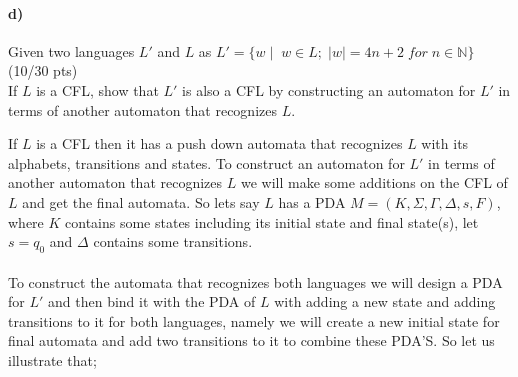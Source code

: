\documentclass[a4paper,12pt]{article}
\begin{document}
\paragraph{d)} Given two languages $L'$ and $L$ as $L'=\{w \mid \; w\in L; \; |w|=4n+2 \; for\; n\in \mathbb{N} \}$
\hfill \small{(10/30 pts)} \\
If $L$ is a CFL, show that $L'$ is also a CFL by constructing an automaton for $L'$ in terms of another automaton that recognizes $L$. \\
\newpage
\begin{tcolorbox}
If $L$ is a CFL then it has a push down automata that recognizes $L$ with its alphabets, transitions and states. To construct an automaton for $L'$ in terms of another automaton that recognizes $L$ we will make some additions on the CFL of $L$ and get the final automata. So lets say $L$ has a PDA $M = (K,\Sigma ,\Gamma ,\Delta ,s,F)$, where $K$ contains some states including its initial state and final state(s), let $s = q_0$ and $\Delta$ contains some transitions.\\\\
To construct the automata that recognizes both languages we will design a PDA for $L'$ and then bind it with the PDA of $L$ with adding a new state and adding transitions to it for both languages, namely we will create a new initial state for final automata and add two transitions to it to combine these PDA'S. So let us illustrate that;\\


\end{tcolorbox}
\end{document}
